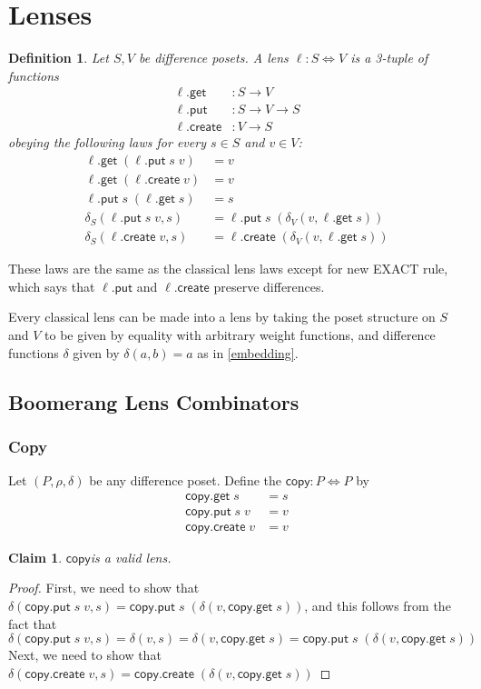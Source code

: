 \documentclass[acmsmall,review,anonymous]{acmart}\settopmatter{printfolios=true,printccs=false,printacmref=false}
\newtheorem{definition}{Definition}
\newtheorem{claim}{Claim}
\newcommand{\kw}[1]{\ensuremath{\mathsf{#1}}}
\newcommand{\get}{\ensuremath{\kw{get}}}
\newcommand{\pput}{\ensuremath{\kw{put}}}
\newcommand{\create}{\ensuremath{\kw{create}}}
\newcommand{\ccopy}{\ensuremath{\kw{copy}}}
\begin{document}
\section{Lenses}
\begin{definition}
Let $S, V$ be difference posets. A lens $\ell : S \Leftrightarrow V$ is a
3-tuple of functions
\begin{align*}
\ell.\get &: S \longrightarrow V\\
\ell.\pput &: S \longrightarrow V \longrightarrow S\\
\ell.\create &: V \longrightarrow S
\end{align*}
obeying the following laws for every $s \in S$ and $v \in V$:
\begin{align*}
\ell.\get \; (\ell.\pput \; s \; v) &= v \tag{PUTGET}\\
\ell.\get \; (\ell.\create \; v) &= v \tag{CREATEGET}\\
\ell.\pput \; s \; (\ell.\get \; s) &= s \tag{GETPUT}\\
\delta_S(\ell.\pput \; s \; v, s) &= \ell.\pput \; s \; (\delta_V(v, \ell.\get \; s))
\tag{PUTEXACT}\\
\delta_S(\ell.\create \; v, s) &= \ell.\create \; (\delta_V(v,
\ell.\get \; s))
\tag{CREATEEXACT}
\end{align*}
\end{definition}
These laws are the same as the classical lens laws except for new EXACT rule,
which says that $\ell.\pput$ and $\ell.\create$ preserve differences.

Every classical lens can be made into a lens by taking the poset structure on
$S$ and $V$ to be given by equality with arbitrary weight functions, and
difference functions $\delta$ given by $\delta(a, b) = a$ as in
\cref{embedding}.
\subsection{Boomerang Lens Combinators}
\subsubsection{Copy}
Let $(P, \rho, \delta)$ be any difference poset. Define the $\ccopy : P
\Leftrightarrow P$ by
\begin{align}
\ccopy.\get \; s &= s\\
\ccopy.\pput \; s \; v &= v\\
\ccopy.\create \; v &= v
\end{align}
\begin{claim}
\ccopy is a valid lens.
\end{claim}
\begin{proof}
First, we need to show that $\delta(\ccopy.\pput \; s \;v, s) = \ccopy.\pput \;
s \; (\delta(v, \ccopy.\get \; s))$, and this follows from the fact that
$$\delta(\ccopy.\pput \; s \;v, s) = \delta(v, s) = \delta(v, \ccopy.\get \;s)
= \ccopy.\pput \; s \; (\delta(v, \ccopy.\get \; s))
$$
Next, we need to show that $\delta(\ccopy.\create \;v, s) = \ccopy.\create \;
(\delta(v, \ccopy.\get \; s))$
\end{proof}
\end{document}

